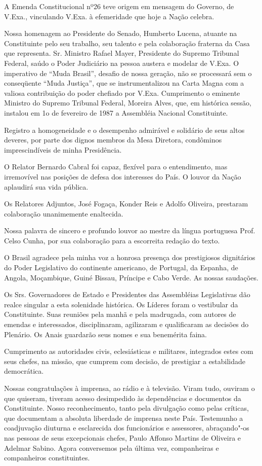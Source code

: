 A Emenda Constitucional nº26 teve origem em mensagem do Governo, de
V.Exa., vinculando V.Exa. à efemeridade que hoje a Nação celebra.

Nossa homenagem ao Presidente do Senado, Humberto Lucena, atuante na
Constituinte pelo seu trabalho, seu talento e pela colaboração fraterna
da Casa que representa. Sr. Ministro Rafael Mayer, Presidente do Supremo
Tribunal Federal, saúdo o Poder Judiciário na pessoa austera e modelar
de V.Exa. O imperativo de ``Muda Brasil'', desafio de nossa geração, não
se processará sem o conseqüente ``Muda Justiça'', que se
instrumentalizou na Carta Magna com a valiosa contribuição do poder
chefiado por V.Exa. Cumprimento o eminente Ministro do Supremo Tribunal
Federal, Moreira Alves, que, em histórica sessão, instalou em 1o de
fevereiro de 1987 a Assembléia Nacional Constituinte.

Registro a homogeneidade e o desempenho admirável e solidário de seus
altos deveres, por parte dos dignos membros da Mesa Diretora, condôminos
imprescindíveis de minha Presidência.

O Relator Bernardo Cabral foi capaz, flexível para o entendimento, mas
irremovível nas posições de defesa dos interesses do País. O louvor da
Nação aplaudirá sua vida pública.

Os Relatores Adjuntos, José Fogaça, Konder Reis e Adolfo Oliveira,
prestaram colaboração unanimemente enaltecida.

Nossa palavra de sincero e profundo louvor ao mestre da língua
portuguesa Prof. Celso Cunha, por sua colaboração para a escorreita
redação do texto.

O Brasil agradece pela minha voz a honrosa presença dos prestigiosos
dignitários do Poder Legislativo do continente americano, de Portugal,
da Espanha, de Angola, Moçambique, Guiné Bissau, Príncipe e Cabo Verde.
As nossas saudações.

Os Srs. Governadores de Estado e Presidentes das Assembléias
Legislativas dão realce singular a esta solenidade histórica. Os Líderes
foram o vestibular da Constituinte. Suas reuniões pela manhã e pela
madrugada, com autores de emendas e interessados, disciplinaram,
agilizaram e qualificaram as decisões do Plenário. Os Anais guardarão
seus nomes e sua benemérita faina.

Cumprimento as autoridades civis, eclesiásticas e militares, integrados
estes com seus chefes, na missão, que cumprem com decisão, de prestigiar
a estabilidade democrática.

Nossas congratulações à imprensa, ao rádio e à televisão. Viram tudo,
ouviram o que quiseram, tiveram acesso desimpedido às dependências e
documentos da Constituinte. Nosso reconhecimento, tanto pela divulgação
como pelas críticas, que documentam a absoluta liberdade de imprensa
neste País. Testemunho a coadjuvação diuturna e esclarecida dos
funcionários e assessores, abraçando"-os nas pessoas de seus excepcionais
chefes, Paulo Affonso Martins de Oliveira e Adelmar Sabino. Agora
conversemos pela última vez, companheiras e companheiros constituintes.

